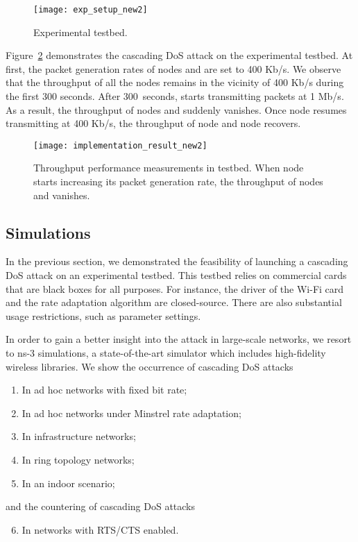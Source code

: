 \documentclass{IEEEtran}
\begin{document}
\begin{figure}[!t]
\centering
\texttt{[image: exp\_setup\_new2]}
\caption{Experimental testbed.}
\label{exp_setup}
\end{figure}

Figure~\ref{implementation_result} demonstrates the cascading DoS
attack on the experimental testbed. At first,  the packet generation
rates of  nodes  and  are set to 400 Kb/s. We observe that the throughput of all the nodes
remains in the vicinity of 400 Kb/s during the first 300 seconds. After 300~seconds,
 starts transmitting packets at 1 Mb/s. As a result, the throughput of nodes  and  suddenly
vanishes.  Once node  resumes transmitting at 400 Kb/s, the
throughput of node  and node  recovers.

\begin{figure}[!t]
\centering
\texttt{[image: implementation\_result\_new2]}
\caption{Throughput performance measurements in testbed. When node
   starts increasing its packet generation rate, the throughput of nodes 
  and  vanishes.}
\label{implementation_result}
\end{figure}


\subsection{Simulations}
\label{Simulations}
In the previous section, we demonstrated the
feasibility of launching a cascading DoS attack on an experimental
testbed. This testbed relies on commercial cards that are
black boxes for all purposes.  For instance, the driver of the Wi-Fi card
and the rate adaptation algorithm are closed-source. There are also
substantial usage restrictions, such as parameter settings.

In order to gain a better insight into the
attack in large-scale networks, we resort to ns-3 simulations, a state-of-the-art simulator which includes high-fidelity wireless libraries. We show
the occurrence of cascading DoS attacks
\begin{enumerate}
\item In ad hoc networks with fixed bit rate;
  \item In ad hoc networks under Minstrel rate adaptation;
  \item In infrastructure networks;
  \item In ring topology networks;
  \item In an indoor scenario;
\end{enumerate}
and the countering of cascading DoS attacks
\begin{enumerate}
  \setcounter{enumi}{5}
  \item In networks with RTS/CTS enabled.
\end{enumerate}
\end{document}
